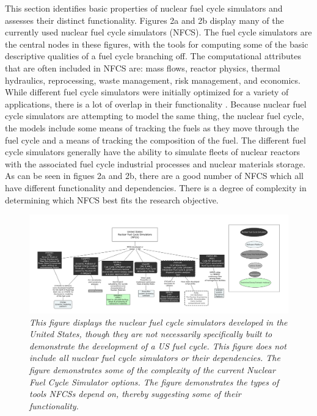 \documentclass[12pt]{UIdahoMastersThesis}
\begin{document}
This section identifies basic properties of nuclear fuel cycle simulators and assesses their distinct functionality. Figures 2a and 2b display many of the currently used nuclear fuel cycle simulators (NFCS). The fuel cycle simulators are the central nodes in these figures, with the tools for computing some of the basic descriptive qualities of a fuel cycle branching off. The computational attributes that are often included in NFCS are: mass flows, reactor physics, thermal hydraulics, reprocessing, waste management, risk management, and economics. While different fuel cycle simulators were initially optimized for a variety of applications, there is a lot of overlap in their functionality \cite {Guerin2009}. Because nuclear fuel cycle simulators are attempting to model the same thing, the nuclear fuel cycle, the models include some means of tracking the fuels as they move through the fuel cycle and a means of tracking the composition of the fuel. The different fuel cycle simulators generally have the ability to simulate fleets of nuclear reactors with the associated fuel cycle industrial processes and nuclear materials storage. As can be seen in figues 2a and 2b, there are a good number of NFCS which all have different functionality and dependencies.  There is a degree of complexity in determining which NFCS best fits the research objective.

\begin{figure}
\includegraphics[width=\textwidth]{US_FUEL_TOOLS.png}
\caption{\small \sl This figure displays the nuclear fuel cycle simulators developed in the United States, though they are not necessarily specifically built to demonstrate the development of a US fuel cycle. This figure does not include all nuclear fuel cycle simulators or their dependencies.  The figure demonstrates some of the complexity of the current Nuclear Fuel Cycle Simulator options. The figure demonstrates the types of tools NFCSs depend on, thereby suggesting some of their functionality.}
\end{figure}
\end{document}

